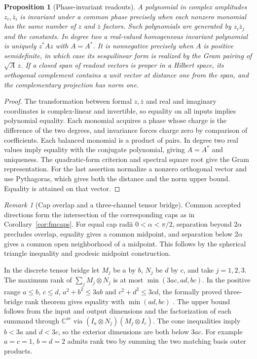 \documentclass[aps,pra,onecolumn,superscriptaddress,nofootinbib,10pt]{revtex4-2}
\newtheorem{proposition}[theorem]{Proposition}
\theoremstyle{definition}
\theoremstyle{remark}
\newtheorem{remark}[theorem]{Remark}
\newcommand{\C}{\mathbb{C}}
\begin{document}
\begin{proposition}[Phase-invariant readouts]\label{ob:phaseinvariance}
A polynomial in complex amplitudes $z_i,\bar z_i$ is invariant under a
common phase precisely when each nonzero monomial has the same number
of $z$ and $\bar z$ factors. Such polynomials are generated by
$z_i\bar z_j$ and the constants. In degree two a real-valued homogeneous
invariant polynomial is uniquely $z^*Az$ with $A=A^*$.
It is nonnegative precisely when $A$ is positive semidefinite, in
which case its sesquilinear form is realized by the Gram pairing of
$\sqrt A\,z$. If a closed span of readout vectors is proper in a
Hilbert space, its orthogonal complement contains a unit vector at
distance one from the span, and the complementary projection has norm one.
\end{proposition}
\begin{proof}
The transformation between formal $z,\bar z$ and real and imaginary
coordinates is complex-linear and invertible, so equality on all
inputs implies polynomial equality. Each monomial acquires a phase
whose charge is the difference of the two degrees, and invariance
forces charge zero by comparison of coefficients. Each balanced
monomial is a product of pairs. In degree two real values imply equality
with the conjugate polynomial, giving $A=A^*$ and uniqueness.
The quadratic-form criterion and spectral square root give the Gram
representation. For the last assertion normalize a nonzero orthogonal
vector and use Pythagoras, which gives both the distance and the norm
upper bound. Equality is attained on that vector.
\end{proof}

\begin{remark}[Cap overlap and a three-channel tensor bridge]\label{ob:bridge}
Common accepted directions form the intersection of the corresponding
caps as in Corollary~\ref{cor:fmcaps}. For equal cap radii
$0<\alpha<\pi/2$, separation beyond $2\alpha$ precludes overlap,
equality gives a common midpoint, and separation below $2\alpha$
gives a common open neighborhood of a midpoint. This follows by
the spherical triangle inequality and geodesic midpoint construction.

In the discrete tensor bridge let $M_j$ be $a$ by $b$, $N_j$ be
$d$ by $c$, and take $j=1,2,3$. The maximum rank of
$\sum_j M_j\otimes N_j$ is at most $\min(3ac,ad,bc)$.
In the positive range $a\le b$, $c\le d$,
$a^2+b^2\le3ab$ and $c^2+d^2\le3cd$, the
formally proved three-bridge rank theorem gives equality with $\min(ad,bc)$
\cite{obr:leanbridge}. The upper bound follows from the input and
output dimensions and the factorization of each summand through
$\C^{ac}$ via $(I_a\otimes N_j)(M_j\otimes I_c)$.
The cone inequalities imply $b<3a$ and $d<3c$, so the exterior
dimensions are both below $3ac$. For example $a=c=1$, $b=d=2$
admits rank two by summing the two matching basis outer products.
\end{remark}
\end{document}
